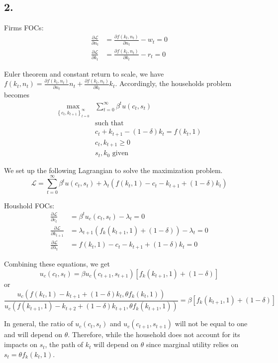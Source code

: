 \documentclass[12pt]{article}
\theoremstyle{definition}
\newcommand\st{\text{such that }}
\newcommand{\cbra}[1]{\left\{#1\right\}}
\begin{document}
\subsection*{2.}

Firms FOCs:
\begin{align*}
\frac{\partial \mathcal{L}}{\partial n_t} &= \frac{\partial f(k_t,n_t)}{\partial n_t}-w_t = 0 \\
\frac{\partial \mathcal{L}}{\partial k_t} &= \frac{\partial f(k_t,n_t)}{\partial k_t}-r_t = 0
\end{align*}

Euler theorem and constant return to scale, we have $f(k_t,n_t)=\frac{\partial f(k_t,n_t)}{\partial n_t}n_t+ \frac{\partial f(k_t,n_t)}{\partial k_t}k_t$. Accordingly, the households problem becomes
\begin{align*}
\max_{\cbra{c_t,k_{t+1}}_{t=0}^\infty} &\sum_{t=0}^{\infty}\beta^t u(c_t,s_t)\\
&\st\\
& c_t+k_{t+1}-(1-\delta)k_t = f(k_t,1)\\
& c_t,k_{t+1}\geq 0\\
& s_t,k_0 \text{ given}
\end{align*}

We set up the following Lagrangian to solve the maximization problem.
\[
\mathcal{L} = \sum_{t=0}^{\infty}\beta^t u(c_t,s_t) + \lambda_t \left(  f(k_t,1)- c_t-k_{t+1}+(1-\delta)k_t \right) 
\]

Houshold FOCs:
\begin{align*}
\frac{\partial \mathcal{L}}{\partial c_t}& = \beta^tu_c(c_t,s_t) -\lambda_t = 0 \\
\frac{\partial \mathcal{L}}{\partial k_{t+1}} &= \lambda_{t+1} \left( f_k(k_{t+1},1) + (1-\delta)\right) - \lambda_t = 0\\
\frac{\partial \mathcal{L}}{\partial \lambda_t} &= f(k_t,1)- c_t-k_{t+1}+(1-\delta)k_t = 0
\end{align*}

Combining these equations, we get
\[
u_c(c_t,s_t)=\beta u_c(c_{t+1},s_{t+1})\left[f_k(k_{t+1},1) + (1-\delta) \right]  
\]
or
\[
\frac{u_c(f(k_{t},1)-k_{t+1}+(1-\delta)k_{t},\theta f_k(k_{t},1))}{u_c(f(k_{t+1},1)-k_{t+2}+(1-\delta)k_{t+1},\theta f_k(k_{t+1},1))}=\beta \left[f_k(k_{t+1},1) + (1-\delta) \right]  
\]

In general, the ratio of $u_c(c_t,s_t)$ and $u_c(c_{t+1},s_{t+1})$ will not be equal to one and will depend on $\theta$. Therefore, while the household does not account for its impacts on $s_t$, the path of $k_t$ will depend on $\theta$ since marginal utility relies on $s_t=\theta f_k(k_t,1)$.
\end{document}
